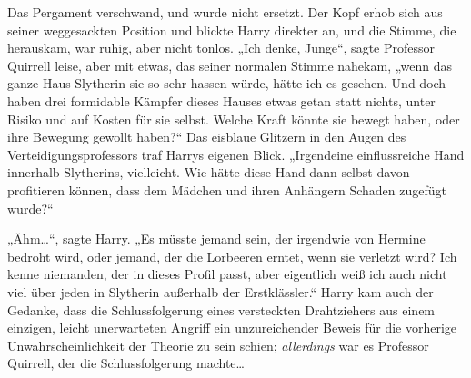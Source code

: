 Das Pergament verschwand, und wurde nicht ersetzt. Der Kopf erhob sich aus seiner weggesackten Position und blickte Harry direkter an, und die Stimme, die herauskam, war ruhig, aber nicht tonlos. „Ich denke, Junge“, sagte Professor Quirrell leise, aber mit etwas, das seiner normalen Stimme nahekam, „wenn das ganze Haus Slytherin sie so sehr hassen würde, hätte ich es gesehen. Und doch haben drei formidable Kämpfer dieses Hauses etwas getan statt nichts, unter Risiko und auf Kosten für sie selbst. Welche Kraft könnte sie bewegt haben, oder ihre Bewegung gewollt haben?“ Das eisblaue Glitzern in den Augen des Verteidigungsprofessors traf Harrys eigenen Blick. „Irgendeine einflussreiche Hand innerhalb Slytherins, vielleicht. Wie hätte diese Hand dann selbst davon profitieren können, dass dem Mädchen und ihren Anhängern Schaden zugefügt wurde?“

„Ähm…“, sagte Harry. „Es müsste jemand sein, der irgendwie von Hermine bedroht wird, oder jemand, der die Lorbeeren erntet, wenn sie verletzt wird? Ich kenne niemanden, der in dieses Profil passt, aber eigentlich weiß ich auch nicht viel über jeden in Slytherin außerhalb der Erstklässler.“ Harry kam auch der Gedanke, dass die Schlussfolgerung eines versteckten Drahtziehers aus einem einzigen, leicht unerwarteten Angriff ein unzureichender Beweis für die vorherige Unwahrscheinlichkeit der Theorie zu sein schien; \emph{allerdings} war es Professor Quirrell, der die Schlussfolgerung machte…

